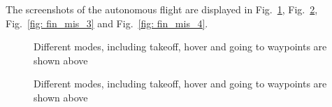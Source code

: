 The screenshots of the autonomous flight are displayed in Fig.~\ref{fig: fin_mis_1}, Fig.~\ref{fig: fin_mis_2}, Fig.~\ref{fig: fin_mis_3} and Fig.~\ref{fig: fin_mis_4}.

\begin{figure}[!h]
	\hfill
	\hfill
	\hfill
	\caption{\label{fig: fin_mis_1}Different modes, including takeoff, hover and going to waypoints are shown above}
\end{figure} 


\begin{figure}[!h]
	\hfill
	\hfill
	\hfill
	\caption{\label{fig: fin_mis_2}Different modes, including takeoff, hover and going to waypoints are shown above}
\end{figure} 


